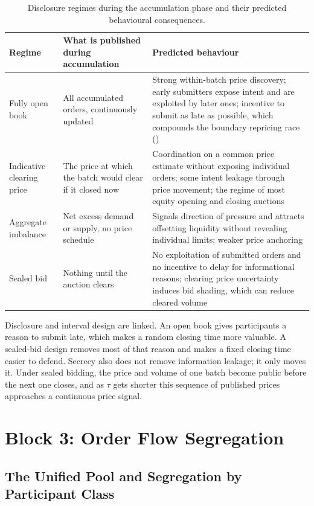 \begin{table}[htbp]
\centering
\caption[Disclosure regimes and induced behaviour]{Disclosure regimes
during the accumulation phase and their predicted behavioural
consequences.}
\label{tab:disclosure}
\small
\begin{tabularx}{\textwidth}{@{}p{2.9cm} L L@{}}
\toprule
\textbf{Regime} & \textbf{What is published during accumulation} &
\textbf{Predicted behaviour}\\
\midrule
Fully open book & All accumulated orders, continuously updated &
Strong within-batch price discovery; early submitters expose intent and
are exploited by later ones; incentive to submit as late as possible,
which compounds the boundary repricing race ()\\
Indicative clearing price & The price at which the batch would clear if
it closed now & Coordination on a common price estimate without exposing
individual orders; some intent leakage through price movement; the
regime of most equity opening and closing auctions\\
Aggregate imbalance & Net excess demand or supply, no price schedule &
Signals direction of pressure and attracts offsetting liquidity without
revealing individual limits; weaker price anchoring\\
Sealed bid & Nothing until the auction clears & No exploitation of
submitted orders and no incentive to delay for informational reasons;
clearing price uncertainty induces bid shading, which can reduce cleared
volume\\
\bottomrule
\end{tabularx}
\end{table}

Disclosure and interval design are linked. An open book gives participants a
reason to submit late, which makes a random closing time more valuable. A
sealed-bid design removes most of that reason and makes a fixed closing time
easier to defend. Secrecy also does not remove information leakage; it only
moves it. Under sealed bidding, the price and volume of one batch become
public before the next one closes, and as $\tau$ gets shorter this sequence of
published prices approaches a continuous price signal.

\section{Block 3: Order Flow Segregation}
\label{sec:segregation}

\subsection{The Unified Pool and Segregation by Participant Class}

